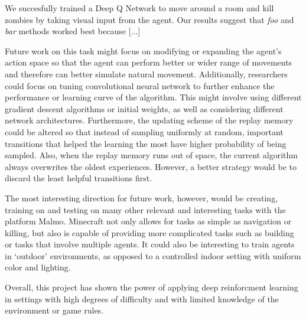 \documentclass{article}
\begin{document}
\begin{multicols}{2}
We succesfully trained a Deep Q Network to move around a room and kill zombies by taking visual input from the agent.
Our results suggest that \emph{foo} and \emph{bar} methods worked best because [...]

Future work on this task might focus on modifying or expanding the agent's action space so that the agent can perform better or wider range of movements and therefore can better simulate natural movement. Additionally, researchers could focus on tuning convolutional neural network to further enhance the performance or learning curve of the algorithm. This might involve using different gradient descent algorithms or initial weights, as well as considering different network architectures. Furthermore, the updating scheme of the replay memory could be altered so that instead of sampling uniformly at random, important transitions that helped the learning the most have higher probability of being sampled. Also, when the replay memory runs out of space, the current algorithm always overwrites the oldest experiences. However, a better strategy would be to discard the least helpful transitions first.

The most interesting direction for future work, however, would be creating, training on and testing on many other relevant and interesting tasks with the platform Malmo. Minecraft not only allows for tasks as simple as navigation or killing, but also is capable of providing more complicated tasks such as building or tasks that involve multiple agents.
It could also be interesting to train agents in `outdoor' environments, as opposed to a controlled indoor setting with uniform color and lighting.

Overall, this project has shown the power of applying deep reinforcment learning in settings with high degrees of difficulty and with limited knowledge of the environment or game rules.

\end{multicols}
\end{document}
